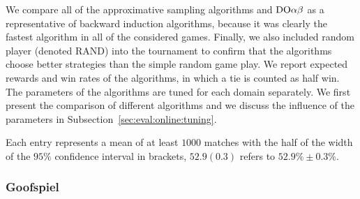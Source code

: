 We compare all of the approximative sampling algorithms and $\textrm{DO}\alpha\beta$ as a representative of backward induction algorithms, because it was clearly the fastest algorithm in all of the considered games.
Finally, we also included random player (denoted RAND) into the tournament to confirm that the algorithms choose better strategies than the simple random game play.
We report expected rewards and win rates of the algorithms, in which a tie is counted as half win.
The parameters of the algorithms are tuned for each domain separately.
We first present the comparison of different algorithms and we discuss the influence of the parameters in Subsection~\ref{sec:eval:online:tuning}.

Each entry represents a mean of at least $1000$ matches with the half of the width of the $95\%$ confidence interval in brackets, \eg $52.9(0.3)$ refers to $52.9\% \pm 0.3\%$.

\subsubsection{Goofspiel}

